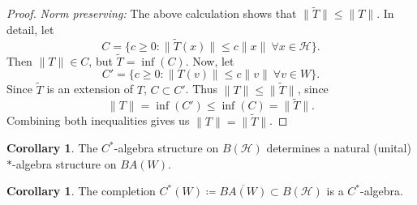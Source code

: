 \documentclass{dcthesis}
\numberwithin{equation}{section}
\numberwithin{equation}{section}
\theoremstyle{definition}
\newtheorem{corollary}[equation]{Corollary}
\begin{document}
\begin{proof}
	\textit{Norm preserving:} The above calculation shows that $\|\tilde{T}\|\leq \|T\|$. In detail, let 
	\begin{equation*}
		C=\{c\geq 0 : \|\tilde{T}(x)\|\leq c\|x\| \ \forall x\in\mathcal{H}\}.
	\end{equation*} 
	Then $\|T\|\in C$, but $\tilde{T}=\inf(C)$. Now, let 
	\begin{equation*}
		C'=\{c\geq 0 : \|T(v)\|\leq c\|v\| \ \forall v\in W\}.
	\end{equation*}
	Since $\tilde{T}$ is an extension of $T$, $C\subset C'$. Thus $\|T\|\leq \|\tilde{T}\|$, since 
	\begin{equation*}
		\|T\|=\inf(C')\leq \inf(C) = \|\tilde{T}\|.
	\end{equation*}
	Combining both inequalities gives us $\|T\|=\|\tilde{T}\|$.
\end{proof}

\begin{corollary}
	The $C^\ast$-algebra structure on $B(\mathcal{H})$ determines a natural (unital) $\ast$-algebra structure on $BA(W)$.
\end{corollary}

\begin{corollary}
	The completion $C^\ast(W)\coloneqq \overline{BA(W)}\subset B(\mathcal{H})$ is a $C^\ast$-algebra.
\end{corollary}
\end{document}
